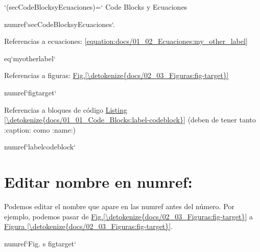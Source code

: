\documentclass[letterpaper,10pt,english]{jupyterBook}
\begin{document}
\begin{sphinxVerbatim}[commandchars=\\\{\}]
`(sec\PYGZus{}Code\PYGZus{}Blocks\PYGZus{}y\PYGZus{}Ecuaciones)=`     
\PYGZsh{} Code Blocks y Ecuaciones 

\PYGZob{}numref\PYGZcb{}`sec\PYGZus{}Code\PYGZus{}Blocks\PYGZus{}y\PYGZus{}Ecuaciones`.
\end{sphinxVerbatim}

\sphinxAtStartPar
Referencias a ecuaciones: \eqref{equation:docs/01_02_Ecuaciones:my_other_label}

\begin{sphinxVerbatim}[commandchars=\\\{\}]
\PYGZob{}eq\PYGZcb{}`my\PYGZus{}other\PYGZus{}label`
\end{sphinxVerbatim}

\sphinxAtStartPar
Referencias a figuras: \hyperref[\detokenize{docs/02_03_Figuras:fig-target}]{Fig.\@ \ref{\detokenize{docs/02_03_Figuras:fig-target}}}

\begin{sphinxVerbatim}[commandchars=\\\{\}]
\PYGZob{}numref\PYGZcb{}`fig\PYGZhy{}target`
\end{sphinxVerbatim}

\sphinxAtStartPar
Referencias a bloques de código \hyperref[\detokenize{docs/01_01_Code_Blocks:label-codeblock}]{Listing \ref{\detokenize{docs/01_01_Code_Blocks:label-codeblock}}} (deben de tener tanto :caption: como :name:)

\begin{sphinxVerbatim}[commandchars=\\\{\}]
\PYGZob{}numref\PYGZcb{}`label\PYGZus{}codeblock`
\end{sphinxVerbatim}


\section{Editar nombre en numref:}
\label{\detokenize{docs/03_00_referenciar_cosas:editar-nombre-en-numref}}
\sphinxAtStartPar
Podemos editar el nombre que apare en las numref antes del número. Por ejemplo, podemos pasar de \hyperref[\detokenize{docs/02_03_Figuras:fig-target}]{Fig.\@ \ref{\detokenize{docs/02_03_Figuras:fig-target}}} a \hyperref[\detokenize{docs/02_03_Figuras:fig-target}]{Figura \ref{\detokenize{docs/02_03_Figuras:fig-target}}}.

\begin{sphinxVerbatim}[commandchars=\\\{\}]
\PYGZob{}numref\PYGZcb{}`Fig. \PYGZpc{}s \PYGZlt{}fig\PYGZhy{}target\PYGZgt{}`
\end{sphinxVerbatim}
\end{document}
